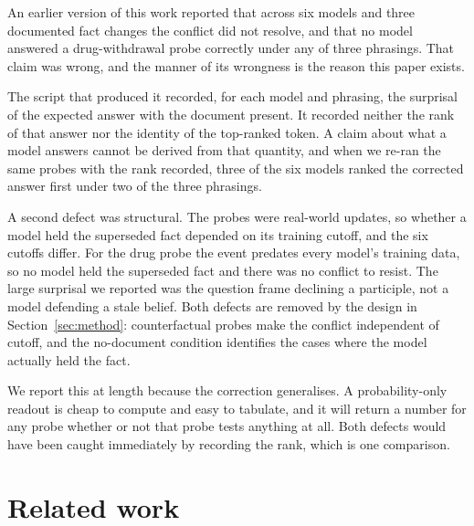 \documentclass{article}
\begin{document}
An earlier version of this work reported that across six models and three
documented fact changes the conflict did not resolve, and that no model answered
a drug-withdrawal probe correctly under any of three phrasings. That claim was
wrong, and the manner of its wrongness is the reason this paper exists.

The script that produced it recorded, for each model and phrasing, the surprisal
of the expected answer with the document present. It recorded neither the rank of
that answer nor the identity of the top-ranked token. A claim about what a model
answers cannot be derived from that quantity, and when we re-ran the same probes
with the rank recorded, three of the six models ranked the corrected answer first
under two of the three phrasings.

A second defect was structural. The probes were real-world updates, so whether a
model held the superseded fact depended on its training cutoff, and the six
cutoffs differ. For the drug probe the event predates every model's training
data, so no model held the superseded fact and there was no conflict to resist.
The large surprisal we reported was the question frame declining a participle,
not a model defending a stale belief. Both defects are removed by the design in
Section~\ref{sec:method}: counterfactual probes make the conflict independent of
cutoff, and the no-document condition identifies the cases where the model
actually held the fact.

We report this at length because the correction generalises. A probability-only
readout is cheap to compute and easy to tabulate, and it will return a number for
any probe whether or not that probe tests anything at all. Both defects would
have been caught immediately by recording the rank, which is one comparison.

\section{Related work}
\end{document}
